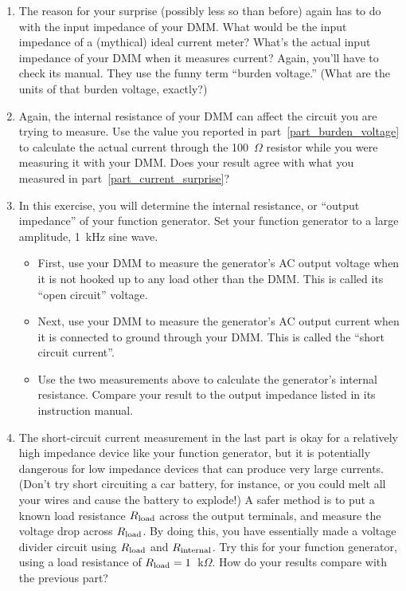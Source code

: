 \begin{enumerate}[wide]
\item The reason for your surprise (possibly less so than before) again has to do with the input impedance of your DMM.  What would be the input impedance of a (mythical) ideal current meter?  What's the actual input impedance of your DMM when it measures current?  Again, you'll have to check its manual.  They use the funny term ``burden voltage.''  (What are the units of that burden voltage, exactly?) \label{part_burden_voltage}

\item Again, the internal resistance of your DMM can affect the circuit you are trying to measure.  Use the value you reported in part~\ref{part_burden_voltage} to calculate the actual current through the 100~$\Omega$ resistor while you were measuring it with your DMM.  Does your result agree with what you measured in part~\ref{part_current_surprise}?

\item In this exercise, you will determine the internal resistance, or ``output impedance'' of your function generator.  Set your function generator to a large amplitude, 1~kHz sine wave.  

\begin{itemize}
\item First, use your DMM to measure the generator's AC output voltage when it is not hooked up to any load other than the DMM.  This is called its ``open circuit'' voltage.  

\item Next, use your DMM to measure the generator's AC output current when it is connected to ground through your DMM.  This is called the ``short circuit current''.   

\item Use the two measurements above to calculate the generator's internal resistance.  Compare your result to the output impedance listed in its instruction manual.
\end{itemize}

\item The short-circuit current measurement in the last part is okay for a relatively high impedance device like your function generator, but it is potentially dangerous for low impedance devices that can produce very large currents.  (Don't try short circuiting a car battery, for instance, or you could melt all your wires and cause the battery to explode!)  A safer method is to put a known load resistance $R_{\rm load}$ across the output terminals, and measure the voltage drop across $R_{\rm load}$.  By doing this, you have essentially made a voltage divider circuit using $R_{\rm load}$ and $R_{\rm internal}$. Try this for your function generator, using a load resistance of $R_{\rm load} = 1$~k$\Omega$.  How do your results compare with the previous part? \label{part_func_gen_impedance}


\end{enumerate}

